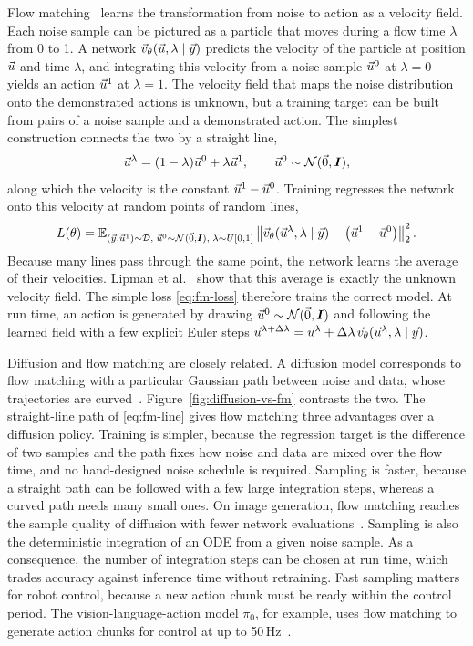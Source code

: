 Flow matching~\cite{Lipman2023,Lipman2024} learns the transformation from noise to action as a velocity field. Each noise sample can be pictured as a particle that moves during a flow time $\lambda$ from 0 to 1. A network $\vec{v}_\theta(\vec{u},\lambda\mid\vec{y})$ predicts the velocity of the particle at position $\vec{u}$ and time $\lambda$, and integrating this velocity from a noise sample $\vec{u}^{0}$ at $\lambda=0$ yields an action $\vec{u}^{1}$ at $\lambda=1$. The velocity field that maps the noise distribution onto the demonstrated actions is unknown, but a training target can be built from pairs of a noise sample and a demonstrated action. The simplest construction connects the two by a straight line,
\begin{equation}\label{eq:fm-line}
  \vec{u}^{\lambda}=(1-\lambda)\vec{u}^{0}+\lambda\vec{u}^{1},\qquad \vec{u}^{0}\sim\mathcal{N}(\vec{0},\boldsymbol{I}),
\end{equation}
along which the velocity is the constant $\vec{u}^{1}-\vec{u}^{0}$. Training regresses the network onto this velocity at random points of random lines,
\begin{equation}\label{eq:fm-loss}
  L(\theta)=\mathbb{E}_{(\vec{y},\vec{u}^{1})\sim\mathcal{D},\;\vec{u}^{0}\sim\mathcal{N}(\vec{0},\boldsymbol{I}),\;\lambda\sim U[0,1]}\left\|\vec{v}_\theta(\vec{u}^{\lambda},\lambda\mid\vec{y})-\left(\vec{u}^{1}-\vec{u}^{0}\right)\right\|_2^{2}.
\end{equation}
Because many lines pass through the same point, the network learns the average of their velocities. Lipman et al.~\cite{Lipman2023} show that this average is exactly the unknown velocity field. The simple loss \eqref{eq:fm-loss} therefore trains the correct model. At run time, an action is generated by drawing $\vec{u}^{0}\sim\mathcal{N}(\vec{0},\boldsymbol{I})$ and following the learned field with a few explicit Euler steps $\vec{u}^{\lambda+\Delta\lambda}=\vec{u}^{\lambda}+\Delta\lambda\,\vec{v}_\theta(\vec{u}^{\lambda},\lambda\mid\vec{y})$.

Diffusion and flow matching are closely related. A diffusion model corresponds to flow matching with a particular Gaussian path between noise and data, whose trajectories are curved~\cite{Lipman2023}. Figure~\ref{fig:diffusion-vs-fm} contrasts the two. The straight-line path of \eqref{eq:fm-line} gives flow matching three advantages over a diffusion policy. Training is simpler, because the regression target is the difference of two samples and the path fixes how noise and data are mixed over the flow time, and no hand-designed noise schedule is required. Sampling is faster, because a straight path can be followed with a few large integration steps, whereas a curved path needs many small ones. On image generation, flow matching reaches the sample quality of diffusion with fewer network evaluations~\cite{Lipman2023}. Sampling is also the deterministic integration of an \ac{ODE} from a given noise sample. As a consequence, the number of integration steps can be chosen at run time, which trades accuracy against inference time without retraining. Fast sampling matters for robot control, because a new action chunk must be ready within the control period. The vision-language-action model $\pi_0$, for example, uses flow matching to generate action chunks for control at up to 50\,Hz~\cite{Black2026}.

